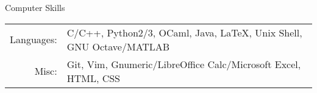 \begin{rSection}{Computer Skills}

  \begin{tabularx}{\linewidth}{rX}
    {\sc Languages:} & C/C++, Python2/3, OCaml, Java, \LaTeX, Unix Shell, GNU Octave/MATLAB \\
    {\sc Misc:} & Git, Vim, Gnumeric/LibreOffice Calc/Microsoft Excel, HTML, CSS
  \end{tabularx}
\end{rSection}
